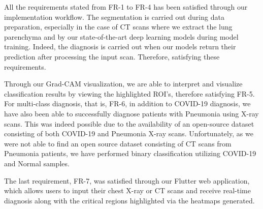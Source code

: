 All the requirements stated from FR-1 to FR-4 has been satisfied through our implementation workflow. The segmentation is carried out during data preparation, especially in the case of CT scans where we extract the lung parenchyma and by our state-of-the-art deep learning models during model training. Indeed, the diagnosis is carried out when our models return their prediction after processing the input scan. Therefore, satisfying these requirements.

Through our Grad-CAM visualization, we are able to interpret and visualize classification results by viewing the highlighted ROI's, therefore satisfying FR-5. For multi-class diagnosis, that is, FR-6, in addition to COVID-19 diagnosis, we have also been able to successfully diagnose patients with Pneumonia using X-ray scans. This was indeed possible due to the availability of an open-source dataset consisting of both COVID-19 and Pneumonia X-ray scans. Unfortunately, as we were not able to find an open source dataset consisting of CT scans from Pneumonia patients, we have performed binary classification utilizing COVID-19 and Normal samples.

The last requirement, FR-7, was satisfied through our Flutter web application, which allows users to input their chest X-ray or CT scans and receive real-time diagnosis along with the critical regions highlighted via the heatmaps generated. 